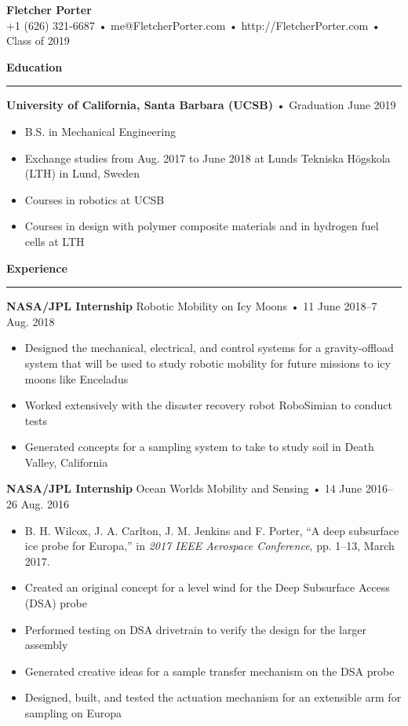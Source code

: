 \documentclass[12pt, oneside]{article}
\newcommand{\titlestyle}[1] {
	{\fontsize{50pt}{1em}\selectfont \bf \textcolor{new_red}{#1}} \\
}
\newcommand{\headingstyleJobs}[1] {
	{\fontsize{20pt}{1em}\selectfont \bf \textcolor{new_red}{#1}}
	\textcolor{new_red}{\rule{3.25in}{0.5pt}} \vspace{3pt}
}
\newcommand{\infostyle}[1] {
	{\fontsize{9pt}{1em}\selectfont #1} \\ \vspace{10pt}
}
\newcommand{\jobtitle}[3] {
	{\bf #1} {#2} • {#3} \vspace{-10pt} \\
}
\begin{document}
\begin{flushleft}



\titlestyle{Fletcher Porter}
\infostyle{+1 (626) 321-6687 • me@FletcherPorter.com • http://FletcherPorter.com • Class of 2019}


\headingstyleJobs{Education}

\jobtitle{University of California, Santa Barbara (UCSB)}{}{Graduation June 2019}
\begin{itemize}
	\item B.S. in Mechanical Engineering
	\item Exchange studies from Aug. 2017 to June 2018 at Lunds Tekniska Högskola (LTH) in Lund, Sweden
	\item Courses in robotics at UCSB
	\item Courses in design with polymer composite materials and in hydrogen fuel cells at LTH
\end{itemize}


\headingstyleJobs{Experience}

\jobtitle{NASA/JPL Internship}{Robotic Mobility on Icy Moons}{11 June 2018–7 Aug. 2018}
\begin{itemize}
	\item Designed the mechanical, electrical, and control systems for a gravity-offload system that will be used to study robotic mobility for future missions to icy moons like Enceladus
	\item Worked extensively with the disaster recovery robot RoboSimian to conduct tests
	\item Generated concepts for a sampling system to take to study soil in Death Valley, California
\end{itemize}

\jobtitle{NASA/JPL Internship}{Ocean Worlds Mobility and Sensing}{14 June 2016–26 Aug. 2016}
\def\HrefFont{\em}
\begin{itemize}
	\item B. H. Wilcox, J. A. Carlton, J. M. Jenkins and F. Porter, ``A deep subsurface ice probe for Europa,'' in \textit{2017 IEEE Aerospace Conference}, pp. 1–13, March 2017.
	\item Created an original concept for a level wind for the Deep Subsurface Access (DSA) probe
	\item Performed testing on DSA drivetrain to verify the design for the larger assembly
	\item Generated creative ideas for a sample transfer mechanism on the DSA probe
	\item Designed, built, and tested the actuation mechanism for an extensible arm for sampling on Europa
\end{itemize}


\end{flushleft}
\end{document}
